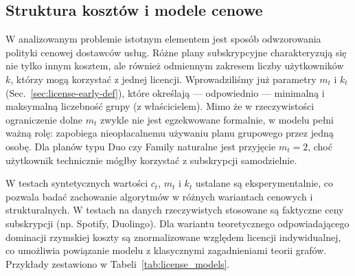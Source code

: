 

\subsection{Struktura kosztów i modele cenowe}

W analizowanym problemie istotnym elementem jest sposób odwzorowania polityki cenowej dostawców usług. Różne plany subskrypcyjne charakteryzują się nie tylko innym kosztem, ale również odmiennym zakresem liczby użytkowników \(k\), którzy mogą korzystać z jednej licencji. Wprowadziliśmy już parametry \(m_t\) i \(k_t\) (Sec.~\ref{sec:license-early-def}), które określają — odpowiednio — minimalną i maksymalną liczebność grupy (z właścicielem). Mimo że w rzeczywistości ograniczenie dolne \(m_t\) zwykle nie jest egzekwowane formalnie, w modelu pełni ważną rolę: zapobiega nieopłacalnemu używaniu planu grupowego przez jedną osobę. Dla planów typu Duo czy Family naturalne jest przyjęcie \(m_t=2\), choć użytkownik technicznie mógłby korzystać z subskrypcji samodzielnie.

W testach syntetycznych wartości $c_t$, $m_t$ i $k_t$ ustalane są eksperymentalnie, co pozwala badać zachowanie algorytmów w różnych wariantach cenowych i strukturalnych. W testach na danych rzeczywistych stosowane są faktyczne ceny subskrypcji (np. Spotify, Duolingo). Dla wariantu teoretycznego odpowiadającego dominacji rzymskiej koszty są znormalizowane względem licencji indywidualnej, co umożliwia powiązanie modelu z klasycznymi zagadnieniami teorii grafów. Przykłady zestawiono w Tabeli~\ref{tab:license_models}.

